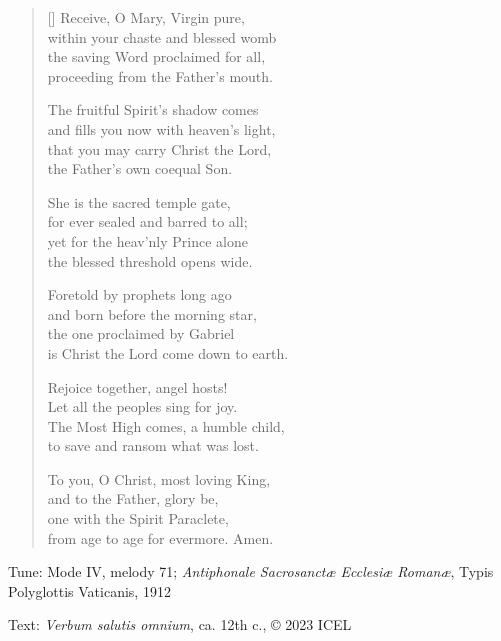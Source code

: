 \hymn

\settowidth{\versewidth}{and fills you now with heaven’s light,}

\begin{verse}[\versewidth]
Receive, O Mary, Virgin pure,\\
within your chaste and blessed womb\\
the saving Word proclaimed for all,\\
proceeding from the Father’s mouth.

The fruitful Spirit’s shadow comes\\
and fills you now with heaven’s light,\\
that you may carry Christ the Lord,\\
the Father’s own coequal Son.

She is the sacred temple gate,\\
for ever sealed and barred to all;\\
yet for the heav’nly Prince alone\\
the blessed threshold opens wide.

Foretold by prophets long ago\\
and born before the morning star,\\
the one proclaimed by Gabriel\\
is Christ the Lord come down to earth.

Rejoice together, angel hosts!\\
Let all the peoples sing for joy.\\
The Most High comes, a humble child,\\
to save and ransom what was lost.

To you, O Christ, most loving King,\\
and to the Father, glory be,\\
one with the Spirit Paraclete,\\
from age to age for evermore. Amen.
\end{verse}

\begin{hymnsource}
Tune: Mode IV, melody 71; \emph{Antiphonale Sacrosanctæ Ecclesiæ Romanæ}, Typis Polyglottis Vaticanis, 1912

Text: \emph{Verbum salutis omnium}, ca. 12th c., © 2023 ICEL
\end{hymnsource}